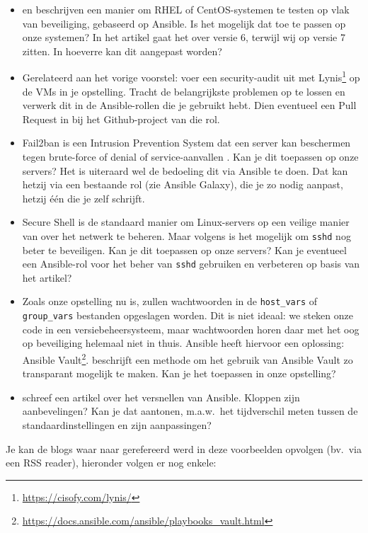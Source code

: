 \begin{itemize}
  \item \textcite{Hayden2015} en \textcite{Davila2015} beschrijven een manier om RHEL of CentOS-sys\-te\-men te testen op vlak van beveiliging, gebaseerd op Ansible. Is het mogelijk dat toe te passen op onze systemen? In het artikel gaat het over versie 6, terwijl wij op versie 7 zitten. In hoeverre kan dit aangepast worden?
  \item Gerelateerd aan het vorige voorstel: voer een security-audit uit met Lynis\footnote{\url{https://cisofy.com/lynis/}} op de VMs in je opstelling. Tracht de belangrijkste problemen op te lossen en verwerk dit in de Ansible-rollen die je gebruikt hebt. Dien eventueel een Pull Request in bij het Github-project van die rol.
  \item Fail2ban is een Intrusion Prevention System dat een server kan beschermen tegen brute-force of denial of service-aanvallen \autocite{Sawiyati2014}. Kan je dit toepassen op onze servers? Het is uiteraard wel de bedoeling dit via Ansible te doen. Dat kan hetzij via een bestaande rol (zie Ansible Galaxy), die je zo nodig aanpast, hetzij één die je zelf schrijft.
  \item Secure Shell is de standaard manier om Linux-servers op een veilige manier van over het netwerk te beheren. Maar volgens \textcite{stribika2015} is het mogelijk om \texttt{sshd} nog beter te beveiligen. Kan je dit toepassen op onze servers? Kan je eventueel een Ansible-rol voor het beher van \texttt{sshd} gebruiken en verbeteren op basis van het artikel?
  \item Zoals onze opstelling nu is, zullen wachtwoorden in de \texttt{host\_vars} of \texttt{group\_vars} bestanden opgeslagen worden. Dit is niet ideaal: we steken onze code in een versiebeheersysteem, maar wachtwoorden horen daar met het oog op beveiliging helemaal niet in thuis. Ansible heeft hiervoor een oplossing: Ansible Vault\footnote{\url{https://docs.ansible.com/ansible/playbooks_vault.html}}. \textcite{Blanc2015} beschrijft een methode om het gebruik van Ansible Vault zo transparant mogelijk te maken. Kan je het toepassen in onze opstelling?
  \item \textcite{Johnson2015} schreef een artikel over het versnellen van Ansible. Kloppen zijn aanbevelingen? Kan je dat aantonen, m.a.w.\ het tijdverschil meten tussen de standaardinstellingen en zijn aanpassingen?
\end{itemize}

Je kan de blogs waar naar gerefereerd werd in deze voorbeelden opvolgen (bv.\ via een RSS reader), hieronder volgen er nog enkele:


